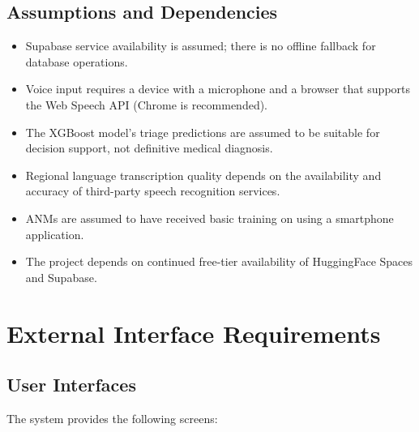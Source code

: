 \documentclass[12pt,a4paper]{article}
\begin{document}
\subsection{Assumptions and Dependencies}
\begin{itemize}
    \item Supabase service availability is assumed; there is no offline fallback for database operations.
    \item Voice input requires a device with a microphone and a browser that supports the Web Speech API (Chrome is recommended).
    \item The XGBoost model's triage predictions are assumed to be suitable for decision support, not definitive medical diagnosis.
    \item Regional language transcription quality depends on the availability and accuracy of third-party speech recognition services.
    \item ANMs are assumed to have received basic training on using a smartphone application.
    \item The project depends on continued free-tier availability of HuggingFace Spaces and Supabase.
\end{itemize}

\section{External Interface Requirements}

\subsection{User Interfaces}
The system provides the following screens:
\end{document}
